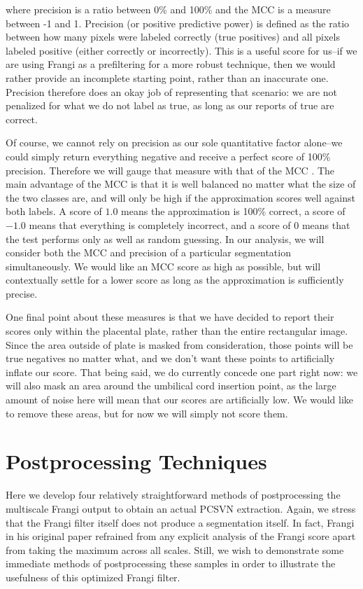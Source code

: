 where precision is a ratio between 0\% and 100\% and the MCC is a measure between -1 and 1. Precision (or positive predictive power) is defined as the ratio between how many pixels were labeled correctly (true positives) and all pixels labeled positive (either correctly or incorrectly). This is a useful score for us--if we are using Frangi as a prefiltering for a more robust technique, then we would rather provide an incomplete starting point, rather than an inaccurate one. Precision therefore does an okay job of representing that scenario: we are not penalized for what we do not label as true, as long as our reports of true are correct.

Of course, we cannot rely on precision as our sole quantitative factor alone--we could simply return everything negative and receive a perfect score of 100\% precision. Therefore we will gauge that measure with that of the MCC \cite{mcc-original-paper}. The main advantage of the MCC is that it is well balanced no matter what the size of the two classes are, and will only be high if the approximation scores well against both labels. A score of $1.0$ means the approximation is 100\% correct, a score of $-1.0$ means that everything is completely incorrect, and a score of $0$ means that the test performs only as well as random guessing. In our analysis, we will consider both the MCC and precision of a particular segmentation simultaneously. We would like an MCC score as high as possible, but will contextually settle for a lower score as long as the approximation is sufficiently precise.

One final point about these measures is that we have decided to report their scores only within the placental plate, rather than the entire rectangular image. Since the area outside of plate is masked from consideration, those points will be true negatives no matter what, and we don't want these points to artificially inflate our score. That being said, we do currently concede one part right now: we will also mask an area around the umbilical cord insertion point, as the large amount of noise here will mean that our scores are artificially low. We would like to remove these areas, but for now we will simply not score them. 

\section{Postprocessing Techniques}
Here we develop four relatively straightforward methods of postprocessing the multiscale Frangi output to obtain an actual PCSVN extraction. Again, we stress that the Frangi filter itself does not produce a segmentation itself. In fact, Frangi in his original paper \cite{frangi-paper} refrained from any explicit analysis of the Frangi score apart from taking the maximum across all scales. Still, we wish to demonstrate some immediate methods of postprocessing these samples in order to illustrate the usefulness of this optimized Frangi filter. 


